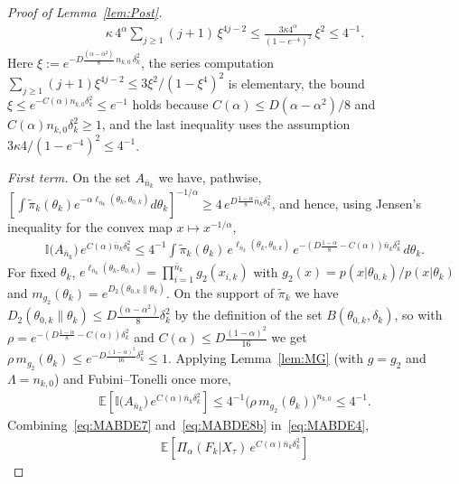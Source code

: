 \documentclass[10pt,a4paper]{amsart}
\def\bbE{\mathbb E}
\def\ind{\mathbb{I}}
\begin{document}
\begin{proof}[Proof of Lemma~\ref{lem:Post}]
\begin{align}
    \kappa\, 4^{\alpha}\sum_{j\geq 1} (j+1)\, \xi^{4j-2} \leq \frac{3\kappa 4^{\alpha}}{(1-e^{-4})^2}\, \xi^{2} \leq 4^{-1}.
    \label{eq:MABDE7}
\end{align}
Here $\xi := e^{-D \frac{(\alpha-\alpha^2)}{8}\, n_{k,0}\, \delta_k^2 }$, the series computation $\sum_{j\geq 1}(j+1)\xi^{4j-2} \leq 3 \xi^2/(1-\xi^4)^2$ is elementary, the bound $\xi \leq e^{-C(\alpha) n_{k,0} \delta_k^2} \leq e^{-1}$ holds because $C(\alpha) \leq D(\alpha-\alpha^2)/8$ and $C(\alpha) n_{k,0} \delta_k^2 \geq 1$, and the last inequality uses the assumption $3\kappa 4/(1-e^{-4})^2 \leq 4^{-1}$.

\emph{First term.} On the set $A_{\bar n_k}$ we have, pathwise, $\left[ \int \tilde \pi_k(\theta_k) e^{-\alpha \ell_{\bar n_k}(\theta_k,\theta_{0,k})} d\theta_k \right]^{-1/\alpha} \geq 4\, e^{ D \frac{1-\alpha}{8} \bar n_k \delta_k^2 }$, and hence, using Jensen's inequality for the convex map $x \mapsto x^{-1/\alpha}$,
\begin{align}
    \ind\big(A_{\bar n_k}\big)\, e^{C(\alpha) \bar n_k \delta_k^2} \leq 4^{-1} \int \tilde \pi_k(\theta_k)\, e^{\ell_{\bar n_k}(\theta_k,\theta_{0,k})}\, e^{ -\left(D \frac{1-\alpha}{8} - C(\alpha)\right) \bar n_k \delta_k^2 }\, d\theta_k.
    \label{eq:MABDE8}
\end{align}
For fixed $\theta_k$, $e^{\ell_{\bar n_k}(\theta_k,\theta_{0,k})} = \prod_{i=1}^{\bar n_k} g_2(x_{i,k})$ with $g_2(x) = p(x|\theta_{0,k})/p(x|\theta_k)$ and $m_{g_2}(\theta_k) = e^{D_2 \left( {\theta_{0,k}}\| {\theta_k} \right)}$. On the support of $\tilde \pi_k$ we have $D_2 \left( {\theta_{0,k}}\| {\theta_k} \right) \leq D \frac{(\alpha-\alpha^2)}{8} \delta_k^2$ by the definition of the set $B\left(\theta_{0,k},\delta_k \right)$, so with $\rho = e^{-\left(D \frac{1-\alpha}{8} - C(\alpha)\right)\delta_k^2}$ and $C(\alpha) \leq D\frac{(1-\alpha)^2}{16}$ we get $\rho\, m_{g_2}(\theta_k) \leq e^{-D \frac{(1-\alpha)^2}{16}\delta_k^2} \leq 1$. Applying Lemma~\ref{lem:MG} (with $g = g_2$ and $\Lambda = n_{k,0}$) and Fubini--Tonelli once more,
\begin{align}
    \bbE\left[\ind\big(A_{\bar n_k}\big)\, e^{C(\alpha) \bar n_k \delta_k^2}\right] \leq 4^{-1} \big(\rho\, m_{g_2}(\theta_k)\big)^{n_{k,0}} \leq 4^{-1}.
    \label{eq:MABDE8b}
\end{align}
Combining~\eqref{eq:MABDE7} and~\eqref{eq:MABDE8b} in~\eqref{eq:MABDE4},
\begin{align}
    \bbE\left[\Pi_{\alpha}(F_k|X_{\tau})\, e^{C(\alpha) \bar n_k \delta_k^2}\right]

\end{align}
\end{proof}
\end{document}
